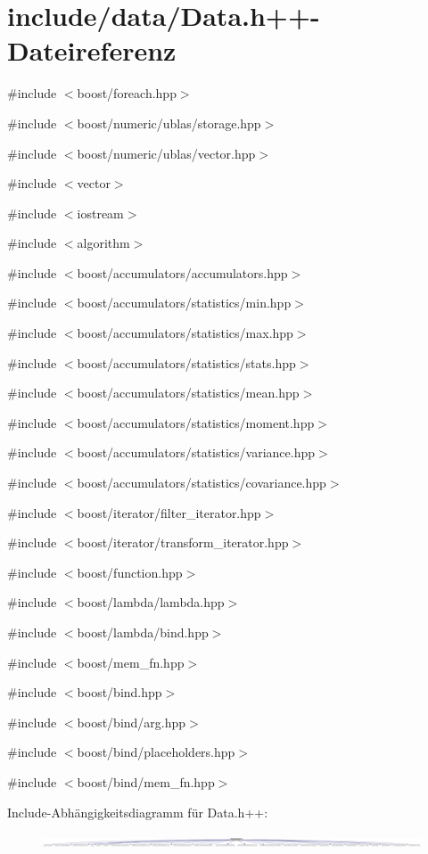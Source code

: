 \hypertarget{Data_8h_09_09}{
\section{include/data/Data.h++-\/Dateireferenz}
\label{Data_8h_09_09}
}
{\ttfamily \#include $<$boost/foreach.hpp$>$}\par
{\ttfamily \#include $<$boost/numeric/ublas/storage.hpp$>$}\par
{\ttfamily \#include $<$boost/numeric/ublas/vector.hpp$>$}\par
{\ttfamily \#include $<$vector$>$}\par
{\ttfamily \#include $<$iostream$>$}\par
{\ttfamily \#include $<$algorithm$>$}\par
{\ttfamily \#include $<$boost/accumulators/accumulators.hpp$>$}\par
{\ttfamily \#include $<$boost/accumulators/statistics/min.hpp$>$}\par
{\ttfamily \#include $<$boost/accumulators/statistics/max.hpp$>$}\par
{\ttfamily \#include $<$boost/accumulators/statistics/stats.hpp$>$}\par
{\ttfamily \#include $<$boost/accumulators/statistics/mean.hpp$>$}\par
{\ttfamily \#include $<$boost/accumulators/statistics/moment.hpp$>$}\par
{\ttfamily \#include $<$boost/accumulators/statistics/variance.hpp$>$}\par
{\ttfamily \#include $<$boost/accumulators/statistics/covariance.hpp$>$}\par
{\ttfamily \#include $<$boost/iterator/filter\_\-iterator.hpp$>$}\par
{\ttfamily \#include $<$boost/iterator/transform\_\-iterator.hpp$>$}\par
{\ttfamily \#include $<$boost/function.hpp$>$}\par
{\ttfamily \#include $<$boost/lambda/lambda.hpp$>$}\par
{\ttfamily \#include $<$boost/lambda/bind.hpp$>$}\par
{\ttfamily \#include $<$boost/mem\_\-fn.hpp$>$}\par
{\ttfamily \#include $<$boost/bind.hpp$>$}\par
{\ttfamily \#include $<$boost/bind/arg.hpp$>$}\par
{\ttfamily \#include $<$boost/bind/placeholders.hpp$>$}\par
{\ttfamily \#include $<$boost/bind/mem\_\-fn.hpp$>$}\par
Include-\/Abhängigkeitsdiagramm für Data.h++:\nopagebreak
\begin{figure}[H]
\begin{center}
\leavevmode
\includegraphics[width=420pt]{Data_8h_09_09__incl}
\end{center}
\end{figure}
